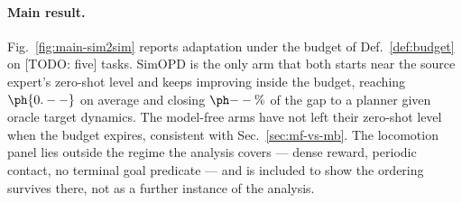 \paragraph{Main result.}
Fig.~\ref{fig:main-sim2sim} reports adaptation under the budget of
Def.~\ref{def:budget} on [TODO: five] tasks. SimOPD is the only arm that both
starts near the source expert's zero-shot level and keeps improving inside the
budget, reaching $\ph{0.--}$ on average and closing $\ph{--\%}$ of the gap to a
planner given oracle target dynamics. The model-free arms have not left their
zero-shot level when the budget expires, consistent with
Sec.~\ref{sec:mf-vs-mb}. The locomotion panel lies outside the regime the
analysis covers --- dense reward, periodic contact, no terminal goal predicate
--- and is included to show the ordering survives there, not as a further
instance of the analysis.

